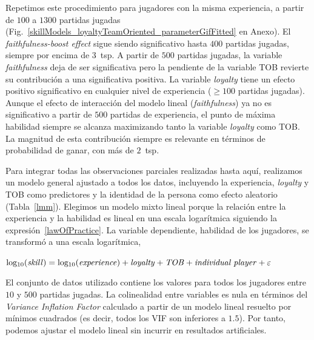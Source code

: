 \documentclass[a4paper,11pt]{book}
\theoremstyle{definition}
\begin{document}
Repetimos este procedimiento para jugadores con la misma experiencia, a partir de $100$ a $1300$ partidas jugadas (Fig.~\ref{skillModels_loyaltyTeamOriented_parameterGifFitted} en Anexo).
%
El \emph{faithfulness-boost effect} sigue siendo significativo hasta $400$ partidas jugadas, siempre por encima de $3$~tsp.
%
A partir de $500$ partidas jugadas, la variable \emph{faithfulness} deja de ser significativa pero la pendiente de la variable TOB revierte su contribuci\'on a una significativa positiva.
%
La variable \emph{loyalty} tiene un efecto positivo significativo en cualquier nivel de experiencia ($\geq 100$ partidas jugadas).
%
Aunque el efecto de interacci\'on del modelo lineal (\emph{faithfulness}) ya no es significativo a partir de $500$ partidas de experiencia, el punto de m\'axima habilidad siempre se alcanza maximizando tanto la variable \emph{loyalty} como TOB.
%
La magnitud de esta contribuci\'on siempre es relevante en t\'erminos de probabilidad de ganar, con m\'as de $2$~tsp.


Para integrar todas las observaciones parciales realizadas hasta aqu\'i, realizamos un modelo general ajustado a todos los datos, incluyendo la experiencia, \emph{loyalty} y TOB como predictores y la identidad de la persona como efecto aleatorio (Tabla~\ref{lmm}).
%
Elegimos un modelo mixto lineal porque la relaci\'on entre la experiencia y la habilidad es lineal en una escala logar\'itmica siguiendo la expresi\'on~\eqref{lawOfPractice}.
%
La variable dependiente, habilidad de los jugadores, se transform\'o a una escala logar\'itmica,

\begin{center}
$\text{log$_{10}$(\emph{skill})} = \text{log$_{10}$(\emph{experience})} + \text{\emph{loyalty}} + \text{\emph{TOB}} + \text{\emph{individual player}} + \varepsilon$
\end{center}

El conjunto de datos utilizado contiene los valores para todos los jugadores entre $10$ y $500$ partidas jugadas.
%
La colinealidad entre variables es nula en t\'erminos del \emph{Variance Inflation Factor} calculado a partir de un modelo lineal resuelto por m\'inimos cuadrados (es decir, todos los VIF son inferiores a $1.5$).
%
Por tanto, podemos ajustar el modelo lineal sin incurrir en resultados artificiales.
\end{document}

